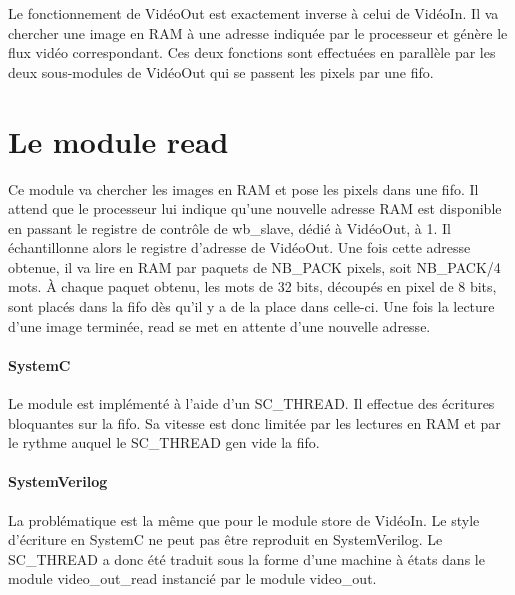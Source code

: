 \documentclass[a4paper,12pt]{report}
\begin{document}
{{                               Le fonctionnement de VidéoOut est exactement inverse à celui de VidéoIn.
                               Il va chercher une image en RAM à une adresse indiquée par le processeur
                               et génère le flux vidéo correspondant.
                               Ces deux fonctions sont effectuées en parallèle par les deux sous-modules de VidéoOut qui se passent
                               les pixels par une fifo.

                               \section*{Le module read}
                               Ce module va chercher les images en RAM et pose les pixels dans une fifo.
                               Il attend que le processeur lui indique qu'une nouvelle adresse RAM est disponible en passant le registre de contrôle de wb\_slave, dédié à VidéoOut, à 1.
                               Il échantillonne alors le registre d'adresse de VidéoOut.
                               Une fois cette adresse obtenue, il va lire en RAM par paquets de NB\_PACK pixels, soit NB\_PACK/4 mots.
                               À chaque paquet obtenu, les mots de 32 bits, découpés en pixel de 8 bits, sont placés dans la fifo dès qu'il y a de la place dans celle-ci.
                               Une fois la lecture d'une image terminée, read se met en attente d'une nouvelle adresse.

                               \paragraph{SystemC}
                               Le module est implémenté à l'aide d'un SC\_THREAD.
                               Il effectue des écritures bloquantes sur la fifo.
                               Sa vitesse est donc limitée par les lectures en RAM et
                               par le rythme auquel le SC\_THREAD gen vide la fifo.

                               \paragraph{SystemVerilog}
                               La problématique est la même que pour le module store de VidéoIn.
                               Le style d'écriture en SystemC ne peut pas être reproduit en SystemVerilog.
                               Le SC\_THREAD a donc été traduit sous la forme d'une machine à états dans le module video\_out\_read instancié par le module video\_out.

}}
\end{document}
